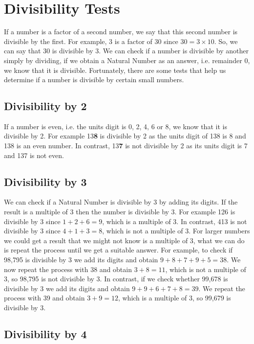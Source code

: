 \documentclass[11pt, oneside]{article}
\theoremstyle{definition}
\begin{document}
\section{Divisibility Tests}

If a number is a factor of a second number, we say that this second number is divisible by the first. For example, 3 is a factor of 30 since $30 = 3\times 10$. So, we can say that 30 is divisible by 3. We can check if a number is divisible by another simply by dividing, if we obtain a Natural Number as an answer, i.e. remainder 0, we know that it is divisible. Fortunately, there are some tests that help us determine if a number is divisible by certain small numbers.

\subsection{Divisibility by 2}

If a number is even, i.e. the units digit is 0, 2, 4, 6 or 8, we know that it is divisible by 2. For example 13{\bf 8} is divisible by 2 as the units digit of 138 is 8 and 138 is an even number. In contrast, 13{\bf 7} is not divisible by 2 as its units digit is 7 and 137 is not even. 

\subsection{Divisibility by 3}

We can check if a Natural Number is divisible by 3 by adding its digits. If the result is a multiple of 3 then the number is divisible by 3. For example 126 is divisible by 3 since $1 + 2 + 6 = 9$, which is a multiple of 3. In contrast, 413 is not divisible by 3 since $4 + 1 + 3 = 8$, which is not a multiple of 3. For larger numbers we could get a result that we might not know is a multiple of 3, what we can do is repeat the process until we get a suitable answer. For example, to check if 98,795 is divisible by 3 we add its digits and obtain $9 + 8 + 7 + 9 + 5 = 38$. We now repeat the process with 38 and obtain $3 + 8 = 11$, which is not a multiple of 3, so 98,795 is not divisible by 3. In contrast, if we check whether 99,678 is divisible by 3 we add its digits and obtain $9 + 9 + 6 + 7 + 8 = 39$. We repeat the process with 39 and obtain $3 + 9 = 12$, which is a multiple of 3, so 99,679 is divisible by 3.

\subsection{Divisibility by 4}
\end{document}
